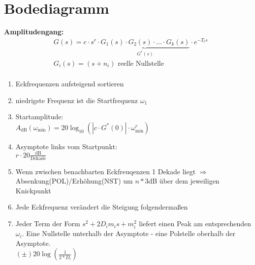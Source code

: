 \setcounter{section}{6}
\section{Bodediagramm}
\begin{tcolorbox}[colback=white!10!white,colframe=blue!50!white,title=Konstruktionsregeln]
    \textbf{Amplitudengang:}
    \begin{align*}
        &G(s) = c\cdot s^r\cdot \underbrace{G_1(s) \cdot G_2(s)\cdot \ldots \cdot G_k(s)}_{G^*(s)}\cdot e^{-T_ts}\\
        &G_i(s)  = (s+n_i)  \text{ reelle Nullstelle}\\
    \end{align*}
    \begin{enumerate}
        \item Eckfrequenzen aufsteigend sortieren
        \item niedrigste Frequenz ist die Startfrequenz $\omega_1$
        \item Startamplitude:\\ $A_{\text{dB}}(\omega_{\text{min}}) = 20 \log_{10}(|c\cdot G^{*}(0)|\cdot \omega_{\text{min}}^r)$
        \item Asymptote links vom Startpunkt:\\
        $r\cdot20 \frac{\text{dB}}{\text{Dekade}}$
        \item Wenn zwischen benachbarten Eckfreuqenzen 1 Dekade liegt $\Rightarrow$ Absenkung(POL)/Erhöhung(NST) um  $n*3$dB über dem jeweiligen Knickpunkt
        \item Jede Eckfrequenz verändert die Steigung folgendermaßen
        \item Jeder Term der Form $s^2 + 2D_im_is+m_i^2$ liefert einen Peak  am entsprechenden $\omega_i$. Eine Nullstelle unterhalb der Asymptote - eine Polstelle oberhalb der Asymptote.\\
        $(\pm)20\log(\frac{1}{2*D_i})$
    \end{enumerate}


\end{tcolorbox}
